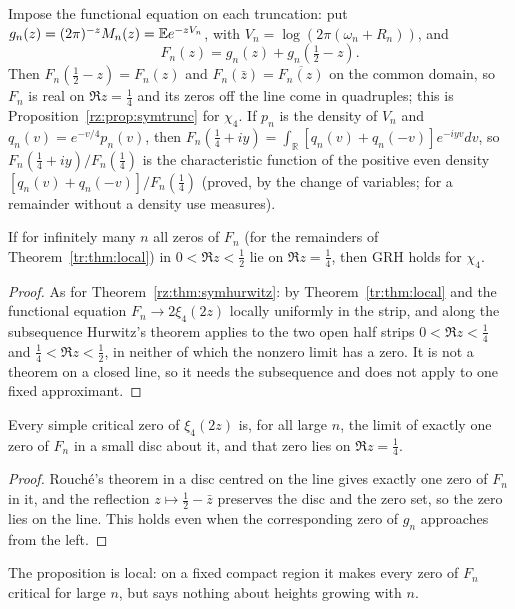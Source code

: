 Impose the functional equation on each truncation: put $g_n(z)=(2\pi)^{-z}M_n(z)=\mathbb{E} e^{-zV_n}$, with $V_n=\log(2\pi(\omega_n+R_n))$, and
\[
F_n(z)=g_n(z)+g_n(\tfrac12-z).
\]
Then $F_n(\frac12-z)=F_n(z)$ and $F_n(\bar z)=\overline{F_n(z)}$ on the common domain, so $F_n$ is real on $\Re z=\frac14$ and its zeros off the line come in quadruples; this is Proposition~\ref{rz:prop:symtrunc} for $\chi_4$. If $p_n$ is the density of $V_n$ and $q_n(v)=e^{-v/4}p_n(v)$, then $F_n(\frac14+iy)=\int_{\mathbb R}[q_n(v)+q_n(-v)]e^{-iyv}dv$, so $F_n(\frac14+iy)/F_n(\frac14)$ is the characteristic function of the positive even density $[q_n(v)+q_n(-v)]/F_n(\frac14)$ (proved, by the change of variables; for a remainder without a density use measures).

\begin{theorem}\label{tr:thm:symhurwitz}
If for infinitely many $n$ all zeros of $F_n$ (for the remainders of Theorem~\ref{tr:thm:local}) in $0<\Re z<\frac12$ lie on $\Re z=\frac14$, then GRH holds for $\chi_4$.
\end{theorem}

\begin{proof}
As for Theorem~\ref{rz:thm:symhurwitz}: by Theorem~\ref{tr:thm:local} and the functional equation $F_n\to2\xi_4(2z)$ locally uniformly in the strip, and along the subsequence Hurwitz's theorem applies to the two open half strips $0<\Re z<\frac14$ and $\frac14<\Re z<\frac12$, in neither of which the nonzero limit has a zero. It is not a theorem on a closed line, so it needs the subsequence and does not apply to one fixed approximant.
\end{proof}

\begin{proposition}\label{tr:prop:symlocal}
Every simple critical zero of $\xi_4(2z)$ is, for all large $n$, the limit of exactly one zero of $F_n$ in a small disc about it, and that zero lies on $\Re z=\frac14$.
\end{proposition}

\begin{proof}
Rouch\'e's theorem in a disc centred on the line gives exactly one zero of $F_n$ in it, and the reflection $z\mapsto\frac12-\bar z$ preserves the disc and the zero set, so the zero lies on the line. This holds even when the corresponding zero of $g_n$ approaches from the left.
\end{proof}

The proposition is local: on a fixed compact region it makes every zero of $F_n$ critical for large $n$, but says nothing about heights growing with $n$.

